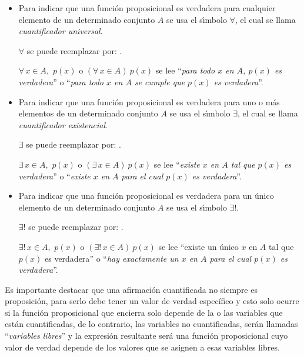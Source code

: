 \begin{itemize}
\item
Para indicar que una funci\'on proposicional es {verdadera} 
{para cualquier} elemento
de un determinado conjunto $ A$ se usa el s\'\i mbolo $ \forall$, el 
cual se llama
{\em cuantificador universal}.

$ \forall$ se puede reemplazar por: .

$ \forall \,x\in A,\,\, p(x)$ \quad o \quad $(\forall\, x \in A)\ p(x)$
\quad se lee 
\quad ``{\em para todo $x$ en $A$, $p(x)$ es
verdadera}'' o ``{\em para todo $x$ en $A$ se cumple que $p(x)$ es
verdadera}''.

\medskip 

\item
Para indicar que una funci\'on proposicional es {verdadera} 
{para uno o más}  
elementos 
de un determinado conjunto $A$ se usa el s\'\i mbolo $ \exists$, el 
cual se llama {\em cuantificador existencial}.

$\exists$ se puede reemplazar por: .

$ \exists \,x\in A,\,\, p(x)$ \quad o \quad 
$(\exists\,x\in A)\ p(x)$ se lee 
\quad ``{\em existe $x$ en $A$ tal que
$p(x)$ es verdadera}'' o ``{\em existe $x$ en $A$ para el cual $p(x)$ es verdadera}''.

\medskip 

\item
Para indicar que una funci\'on proposicional es {verdadera} 
{para un \'unico} elemento
de un determinado conjunto $ A$  se usa el s\'\i mbolo $ \exists !$.

\vspace{5pt}
$ \exists !$ se puede reemplazar por: 
.


$ \exists ! \,x\in A,\,\, p(x)$ \quad o
\quad $(\exists !\,x\in A)\ p(x)$ se lee 
\quad ``{existe un único $x$ en $A$ tal que
$p(x)$ es verdadera}'' o ``{\em hay exactamente un $x$ en $A$ para el cual $p(x)$ es verdadera}''.
\end{itemize}


Es importante destacar  que una afirmaci\'on cuantificada 
no siempre es proposici\'on, para serlo
debe tener un valor de verdad específico 
y esto solo ocurre
si la funci\'on proposicional que encierra 
solo depende de la o las variables que están cuantificadas, 
de lo contrario, las variables no cuantificadas, 
serán llamadas ``{\em variables libres}'' y 
la expresi\'on resultante será una función proposicional 
cuyo valor de verdad depende de los
valores que se asignen a esas variables libres.

